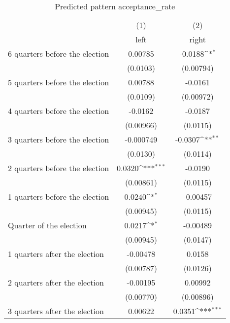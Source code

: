 \begin{table}[htbp]\centering
\def\sym#1{\ifmmode^{#1}\else\(^{#1}\)\fi}
\caption{Predicted pattern acceptance\_rate}
\begin{tabular}{l*{2}{c}}
\hline\hline
                    &\multicolumn{1}{c}{(1)}&\multicolumn{1}{c}{(2)}\\
                    &\multicolumn{1}{c}{left}&\multicolumn{1}{c}{right}\\
\hline
 6 quarters before the election&     0.00785         &     -0.0188\sym{*}  \\
                    &    (0.0103)         &   (0.00794)         \\
[1em]
 5 quarters before the election&     0.00788         &     -0.0161         \\
                    &    (0.0109)         &   (0.00972)         \\
[1em]
 4 quarters before the election&     -0.0162         &     -0.0187         \\
                    &   (0.00966)         &    (0.0115)         \\
[1em]
 3 quarters before the election&   -0.000749         &     -0.0307\sym{**} \\
                    &    (0.0130)         &    (0.0114)         \\
[1em]
 2 quarters before the election&      0.0320\sym{***}&     -0.0190         \\
                    &   (0.00861)         &    (0.0115)         \\
[1em]
 1 quarters before the election&      0.0240\sym{*}  &    -0.00457         \\
                    &   (0.00945)         &    (0.0115)         \\
[1em]
Quarter of the election&      0.0217\sym{*}  &    -0.00489         \\
                    &   (0.00945)         &    (0.0147)         \\
[1em]
 1 quarters after the election&    -0.00478         &      0.0158         \\
                    &   (0.00787)         &    (0.0126)         \\
[1em]
 2 quarters after the election&    -0.00195         &     0.00992         \\
                    &   (0.00770)         &   (0.00896)         \\
[1em]
 3 quarters after the election&     0.00622         &      0.0351\sym{***}\\

\end{tabular}
\end{table}
